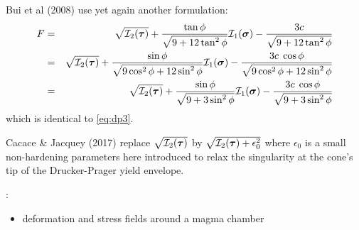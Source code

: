 \begin{remark}
Bui et al (2008) \cite{bufs08} use yet again another formulation:
\begin{eqnarray}
F 
&=& \sqrt{{\cal I}_2({\bm \tau})} + \frac{\tan \phi}{\sqrt{9 + 12 \tan^2 \phi}} {\cal I}_1({\bm \sigma})
- \frac{3 c}{\sqrt{9 + 12 \tan^2 \phi}} \nonumber\\
&=& \sqrt{{\cal I}_2({\bm \tau})} + \frac{\sin \phi}{\sqrt{9\cos^2 \phi + 12 \sin^2 \phi}} {\cal I}_1({\bm \sigma}) - \frac{3 c \; \cos\phi}{\sqrt{9\cos^2\phi + 12 \sin^2 \phi}} \nonumber\\
&=& \sqrt{{\cal I}_2({\bm \tau})} + \frac{\sin \phi}{\sqrt{9 + 3 \sin^2 \phi}} {\cal I}_1({\bm \sigma}) - \frac{3 c \; \cos\phi}{\sqrt{9 + 3\sin^2 \phi}} \nonumber
\end{eqnarray}
which is identical to \eqref{eq:dp3}.
\end{remark}

\begin{remark}
Cacace \& Jacquey (2017) \cite{caja17} replace $\sqrt{{\cal I}_2({\bm \tau})}$ by 
$\sqrt{{\cal I}_2({\bm \tau})+\epsilon_0^2}$ where $\epsilon_0$ is a small non-hardening parameters 
here introduced to relax the singularity at the cone’s tip of the Drucker-Prager yield envelope.
\end{remark}

\Literature:
\begin{itemize}
\item deformation and stress fields around a magma chamber \cite{cuwi14}
\end{itemize}

\newpage
